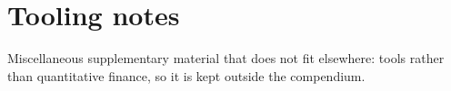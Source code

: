 \chapter{Tooling notes}\label{tooling}

Miscellaneous supplementary material that does not fit elsewhere: tools rather than quantitative finance, so it is kept outside the compendium.





%


%
